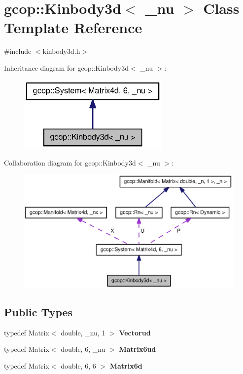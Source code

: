 \section{gcop\-:\-:\-Kinbody3d$<$ \-\_\-nu $>$ \-Class \-Template \-Reference}
\label{classgcop_1_1Kinbody3d}


{\ttfamily \#include $<$kinbody3d.\-h$>$}



\-Inheritance diagram for gcop\-:\-:\-Kinbody3d$<$ \-\_\-nu $>$\-:\nopagebreak
\begin{figure}[H]
\begin{center}
\leavevmode
\includegraphics[width=210pt]{classgcop_1_1Kinbody3d__inherit__graph}
\end{center}
\end{figure}


\-Collaboration diagram for gcop\-:\-:\-Kinbody3d$<$ \-\_\-nu $>$\-:\nopagebreak
\begin{figure}[H]
\begin{center}
\leavevmode
\includegraphics[width=350pt]{classgcop_1_1Kinbody3d__coll__graph}
\end{center}
\end{figure}
\subsection*{\-Public \-Types}
\begin{DoxyCompactItemize}
\item 
typedef \-Matrix$<$ double, \-\_\-nu, 1 $>$ {\bf \-Vectorud}
\item 
typedef \-Matrix$<$ double, 6, \-\_\-nu $>$ {\bf \-Matrix6ud}
\item 
typedef \-Matrix$<$ double, 6, 6 $>$ {\bf \-Matrix6d}
\end{DoxyCompactItemize}

